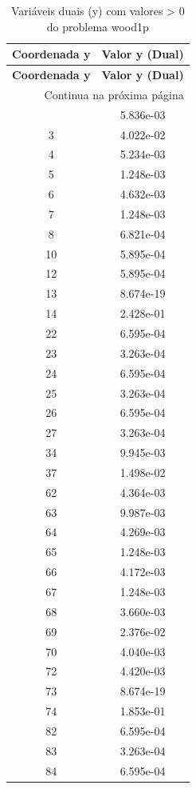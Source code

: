 \documentclass[12pt]{article}
\begin{document}
\begin{longtable}{@{}cc@{}}
\caption{Variáveis duais (y) com valores > 0 do problema wood1p} \\
\toprule
\textbf{Coordenada y} & \textbf{Valor y (Dual)} \\
\midrule
\endfirsthead

\toprule
\textbf{Coordenada y} & \textbf{Valor y (Dual)} \\
\midrule
\endhead

\midrule \multicolumn{2}{r}{{Continua na próxima página}} \\ \midrule
\endfoot

\bottomrule
\endlastfoot
2 & 5.836e-03 \\
3 & 4.022e-02 \\
4 & 5.234e-03 \\
5 & 1.248e-03 \\
6 & 4.632e-03 \\
7 & 1.248e-03 \\
8 & 6.821e-04 \\
10 & 5.895e-04 \\
12 & 5.895e-04 \\
13 & 8.674e-19 \\
14 & 2.428e-01 \\
22 & 6.595e-04 \\
23 & 3.263e-04 \\
24 & 6.595e-04 \\
25 & 3.263e-04 \\
26 & 6.595e-04 \\
27 & 3.263e-04 \\
34 & 9.945e-03 \\
37 & 1.498e-02 \\
62 & 4.364e-03 \\
63 & 9.987e-03 \\
64 & 4.269e-03 \\
65 & 1.248e-03 \\
66 & 4.172e-03 \\
67 & 1.248e-03 \\
68 & 3.660e-03 \\
69 & 2.376e-02 \\
70 & 4.040e-03 \\
72 & 4.420e-03 \\
73 & 8.674e-19 \\
74 & 1.853e-01 \\
82 & 6.595e-04 \\
83 & 3.263e-04 \\
84 & 6.595e-04 \\

\end{longtable}
\end{document}
